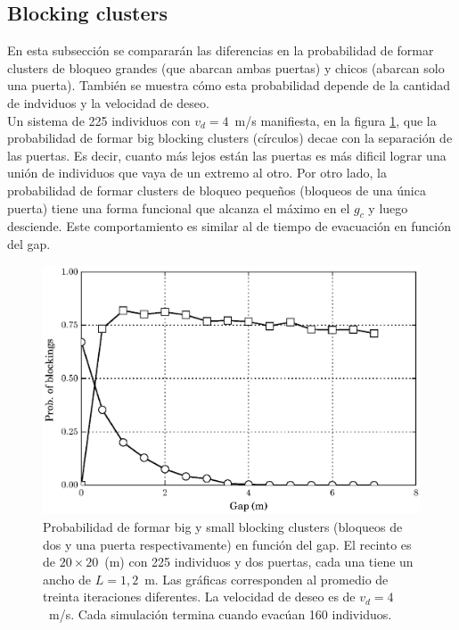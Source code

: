 

\subsection{Blocking clusters}

En esta subsección se compararán las diferencias en la probabilidad de formar clusters de bloqueo grandes (que abarcan ambas puertas) y chicos (abarcan solo una puerta). También se muestra cómo esta probabilidad depende de la cantidad de indviduos y la velocidad de deseo.\\
Un sistema de 225 individuos con $v_d=4$~m/s manifiesta, en la figura \ref{proba_vsgap_v4_big_small}, que la probabilidad de formar big blocking clusters (círculos) decae con la separación de las puertas. Es decir, cuanto más lejos están las puertas es más dificil lograr una unión de individuos que vaya de un extremo al otro.
Por otro lado, la probabilidad de formar clusters de bloqueo pequeños (bloqueos de una única puerta) tiene una forma funcional que alcanza el máximo en el $g_c$ y luego desciende. Este comportamiento es similar al de tiempo de evacuación en función del gap.


\begin{figure}[H]
    \centering
    \includegraphics[scale=0.8]{figuras/proba_vsgap_v4_big_small.eps}
    \caption[width=5cm]{Probabilidad de formar big y small blocking clusters (bloqueos de dos y una puerta respectivamente) en función del gap. El recinto es de $20\times 20$~(m) con 225 individuos y dos puertas, cada una tiene un ancho de $L=1,2$~m. Las gráficas corresponden al promedio de treinta iteraciones diferentes. La velocidad de deseo es de $v_d=4$~m/s. Cada simulación termina cuando evacúan 160 individuos.}
    \label{proba_vsgap_v4_big_small}
\end{figure}


